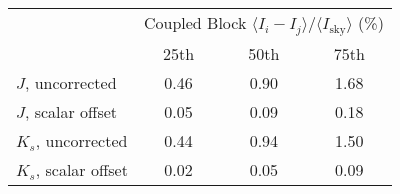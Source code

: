 \begin{tabular}{lccc}
& \multicolumn{3}{c}{Coupled Block
$\langle I_i - I_j\rangle / \langle I_\mathrm{sky} \rangle$ (\%)} \\
& 25th & 50th & 75th \\
\hline
$J$, uncorrected & 0.46 & 0.90 & 1.68 \\
$J$, scalar offset & 0.05 & 0.09 & 0.18 \\
\hline
$K_s$, uncorrected & 0.44 & 0.94 & 1.50 \\
$K_s$, scalar offset & 0.02 & 0.05 & 0.09 \\
\hline
\end{tabular}